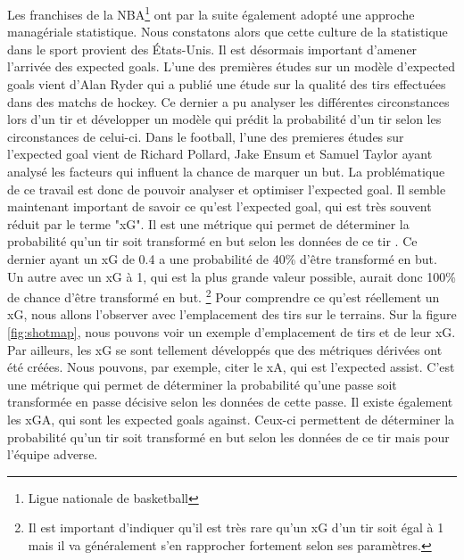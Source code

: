 \documentclass[12pt]{article}
\begin{document}
Les franchises de la NBA\footnote{Ligue nationale de basketball} ont par la suite également adopté une approche managériale statistique.
Nous constatons alors que cette culture de la statistique dans le sport provient des États-Unis.
\newline
Il est désormais important d'amener l'arrivée des expected goals. 
L'une des premières études sur un modèle d'expected goals vient d'Alan Ryder qui a publié une étude sur la qualité des tirs effectuées dans des matchs de hockey. \cite{ryderIsolatingShotQuality2004}
Ce dernier a pu analyser les différentes circonstances lors d'un tir et développer un modèle qui prédit la probabilité d'un tir selon les circonstances de celui-ci.
Dans le football, l'une des premieres études sur l'expected goal vient de Richard Pollard, Jake Ensum et Samuel Taylor ayant analysé les facteurs qui influent la chance de marquer un but. \cite{pollardEstimatingProbabilityShot2004} La problématique de ce travail est donc de pouvoir analyser et optimiser l'expected goal.
\newline\newline
Il semble maintenant important de savoir ce qu'est l'expected goal, qui est très souvent réduit par le terme "xG". 
Il est une métrique qui permet de déterminer la probabilité qu'un tir soit transformé en but selon les données de ce tir \cite{XGExplainedFBrefa}.
Ce dernier ayant un xG de 0.4 a une probabilité de 40\% d'être transformé en but. Un autre avec un xG à 1, qui est la plus grande valeur possible, aurait donc 100\% de chance d'être transformé en but.
\footnote{Il est important d'indiquer qu'il est très rare qu'un xG d'un tir soit égal à 1 mais il va généralement s'en rapprocher fortement selon ses paramètres.} \cite{pettyWhatExpectedGoals2018a}
\newline\newline
Pour comprendre ce qu'est réellement un xG, nous allons l'observer avec l'emplacement des tirs sur le terrains.
Sur la figure \ref{fig:shotmap}, nous pouvons voir un exemple d'emplacement de tirs et de leur xG.
\newline \newline
Par ailleurs, les xG se sont tellement développés que des métriques dérivées ont été créées. 
Nous pouvons, par exemple, citer le xA, qui est l'expected assist.
C'est une métrique qui permet de déterminer la probabilité qu'une passe soit transformée en passe décisive selon les données de cette passe. \cite{XGExplainedFBrefa}
Il existe également les xGA, qui sont les expected goals against. 
Ceux-ci permettent de déterminer la probabilité qu'un tir soit transformé en but selon les données de ce tir mais pour l'équipe adverse. \cite{pettyWhatExpectedGoals2018a}
\end{document}
